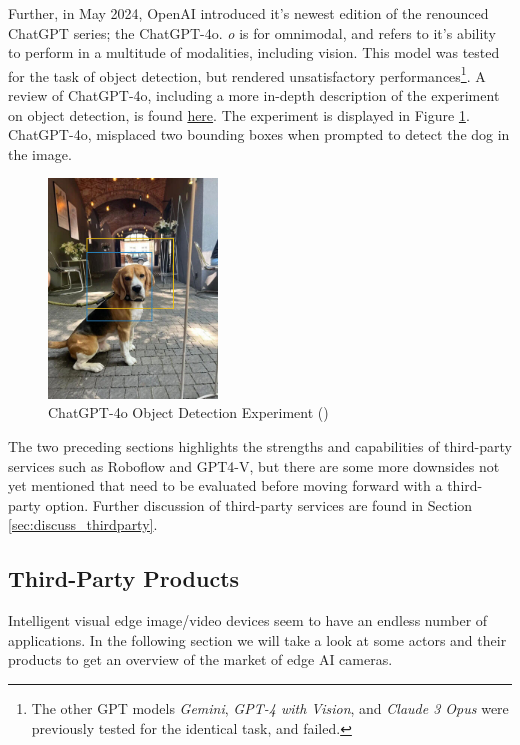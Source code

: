 Further, in May 2024, OpenAI introduced it's newest edition of the renounced ChatGPT series; the ChatGPT-4o. \textit{o} is for omnimodal, and refers to it's ability to perform in a multitude of modalities, including vision. This model was tested for the task of object detection, but rendered unsatisfactory performances\footnote{The other GPT models \textit{Gemini}, \textit{GPT-4 with Vision}, and \textit{Claude 3 Opus} were previously tested for the identical task, and failed.}. A review of ChatGPT-4o, including a more in-depth description of the experiment on object detection, is found \href{https://blog.roboflow.com/gpt-4o-vision-use-cases/}{here}. The experiment is displayed in Figure \ref{fig:gpt4o_experiment}. ChatGPT-4o, misplaced two bounding boxes when prompted to detect the dog in the image.

\begin{figure}[H]
    \centering
    \includegraphics[width=0.4\textwidth]{Images/gpt4o_object_detection_just_dog.jpg}
    \caption[ChatGPT-4o Object Detection Experiment]{\centering ChatGPT-4o Object Detection Experiment (\cite{ue2024chatgpt4o})}
    \label{fig:gpt4o_experiment}
\end{figure}

The two preceding sections highlights the strengths and capabilities of third-party services such as Roboflow and GPT4-V, but there are some more downsides not yet mentioned that need to be evaluated before moving forward with a third-party option. Further discussion of third-party services are found in Section \ref{sec:discuss_thirdparty}.

\subsection{Third-Party Products}
\label{sec:thirdparty_products}
Intelligent visual edge image/video devices seem to have an endless number of applications. In the following section we will take a look at some actors and their products to get an overview of the market of edge AI cameras.

